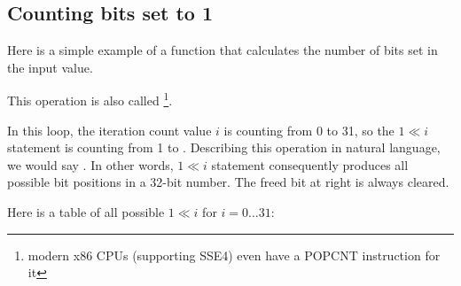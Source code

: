 ﻿\subsection{Counting bits set to 1}

Here is a simple example of a function that calculates the number of bits set in the input value.

This operation is also called \footnote{modern x86 CPUs (supporting SSE4) even have a POPCNT instruction for it}.



In this loop, the iteration count value $i$ is counting from 0 to 31, 
so the $1 \ll i$ statement is counting from 1 to .
Describing this operation in natural language, we would say .
In other words, $1 \ll i$ statement consequently produces all possible bit positions in a 32-bit number.
The freed bit at right is always cleared.

Here is a table of all possible $1 \ll i$ 
for $i=0 \ldots 31$:

